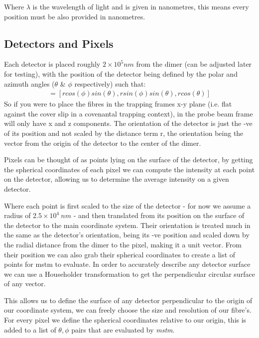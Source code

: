 Where $\lambda$ is the wavelength of light and is given in nanometres, this means 
every position must be also provided in nanometres. 

\subsection{Detectors and Pixels}
Each detector is placed roughly $2\times 10^5 nm$ from the dimer (can be adjusted 
later for testing), with the position of the detector being defined by the polar 
and azimuth angles ($\theta$ \& $\phi$ respectively) such that:
\begin{align}
	[x_{fiber}, y_{fiber}, z_{fiber}] = [rcos(\phi)sin(\theta), rsin(\phi)sin(\theta), rcos(\theta)]
\end{align}
So if you were to place the fibres in the trapping frames x-y plane (i.e. flat against
the cover slip in a covenantal trapping context), in the probe beam frame will only 
have x and z components. The orientation of the detector is just the -ve of its 
position and not scaled by the distance term r, the orientation being the vector from 
the origin of the detector to the center of the dimer. 

Pixels can be thought of as points lying on the surface of the detector, by getting 
the spherical coordinates of each pixel we can compute the intensity at each point on 
the detector, allowing us to determine the average intensity on a given detector. 

Where each point is first scaled to the size of the detector - for now we assume a 
radius of $2.5 \times 10^4 \ nm$ - and then translated from its position on the 
surface of the detector to the main coordinate system. Their orientation is treated 
much in the same as the detector's orientation, being its -ve position and scaled down 
by the radial distance from the dimer to the pixel, making it a unit vector. From 
their position we can also grab their spherical coordinates to create a list of points 
for mstm to evaluate. In order to accurately describe any detector surface we can use a Householder transformation to get the perpendicular circular surface of any vector.

This allows us to define the surface of any detector perpendicular to the origin of 
our coordinate system, we can freely choose the size and resolution of our fibre's. 
For every pixel we define the spherical coordinates relative to our origin, this is 
added to a list of $\theta, \phi$ pairs that are evaluated by \textit{mstm}. 

